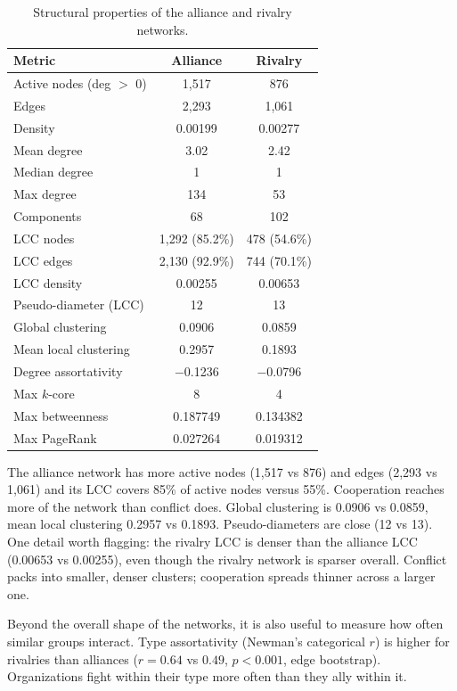 \documentclass[11pt,a4paper]{article}
\begin{document}
\begin{table}[H]
\centering
\caption{Structural properties of the alliance and rivalry networks.}
\label{tab:structural}
\small
\begin{tabular}{@{}lcc@{}}
\toprule
\textbf{Metric} & \textbf{Alliance} & \textbf{Rivalry} \\
\midrule
Active nodes (deg $>$ 0) & 1{,}517 & 876 \\
Edges & 2{,}293 & 1{,}061 \\
Density & 0.00199 & 0.00277 \\
Mean degree & 3.02 & 2.42 \\
Median degree & 1 & 1 \\
Max degree & 134 & 53 \\
Components & 68 & 102 \\
LCC nodes & 1{,}292 (85.2\%) & 478 (54.6\%) \\
LCC edges & 2{,}130 (92.9\%) & 744 (70.1\%) \\
LCC density & 0.00255 & 0.00653 \\
Pseudo-diameter (LCC) & 12 & 13 \\
Global clustering & 0.0906 & 0.0859 \\
Mean local clustering & 0.2957 & 0.1893 \\
Degree assortativity & $-$0.1236 & $-$0.0796 \\
Max $k$-core & 8 & 4 \\
Max betweenness & 0.187749 & 0.134382 \\
Max PageRank & 0.027264 & 0.019312 \\
\bottomrule
\end{tabular}
\end{table}

The alliance network has more active nodes (1{,}517 vs 876) and edges (2{,}293 vs 1{,}061) and its LCC covers 85\% of active nodes versus 55\%. Cooperation reaches more of the network than conflict does. Global clustering is 0.0906 vs 0.0859, mean local clustering 0.2957 vs 0.1893. Pseudo-diameters are close (12 vs 13). One detail worth flagging: the rivalry LCC is denser than the alliance LCC (0.00653 vs 0.00255), even though the rivalry network is sparser overall. Conflict packs into smaller, denser clusters; cooperation spreads thinner across a larger one.

Beyond the overall shape of the networks, it is also useful to measure how often similar groups interact. Type assortativity (Newman's categorical \href{https://journals.aps.org/pre/abstract/10.1103/PhysRevE.67.026126}{$r$}) is higher for rivalries than alliances ($r = 0.64$ vs $0.49$, $p < 0.001$, edge bootstrap). Organizations fight within their type more often than they ally within it.
\end{document}
